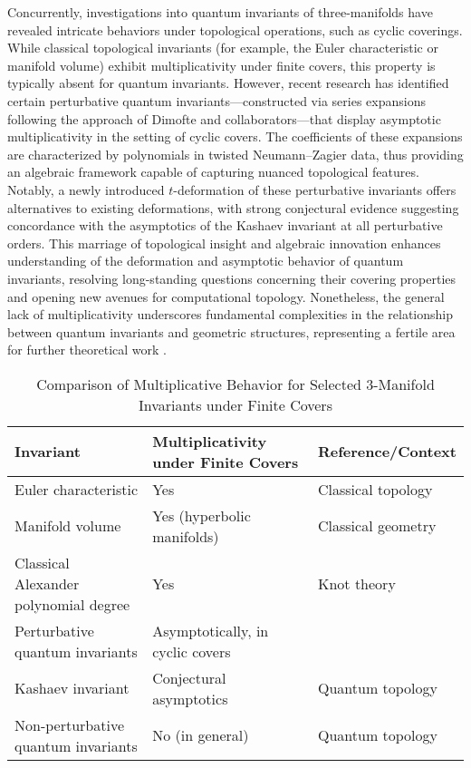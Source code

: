 \documentclass[sigconf]{acmart}
\begin{document}
Concurrently, investigations into quantum invariants of three-manifolds have revealed intricate behaviors under topological operations, such as cyclic coverings. While classical topological invariants (for example, the Euler characteristic or manifold volume) exhibit multiplicativity under finite covers, this property is typically absent for quantum invariants. However, recent research has identified certain perturbative quantum invariants—constructed via series expansions following the approach of Dimofte and collaborators—that display asymptotic multiplicativity in the setting of cyclic covers. The coefficients of these expansions are characterized by polynomials in twisted Neumann–Zagier data, thus providing an algebraic framework capable of capturing nuanced topological features. Notably, a newly introduced $t$-deformation of these perturbative invariants offers alternatives to existing deformations, with strong conjectural evidence suggesting concordance with the asymptotics of the Kashaev invariant at all perturbative orders. This marriage of topological insight and algebraic innovation enhances understanding of the deformation and asymptotic behavior of quantum invariants, resolving long-standing questions concerning their covering properties and opening new avenues for computational topology. Nonetheless, the general lack of multiplicativity underscores fundamental complexities in the relationship between quantum invariants and geometric structures, representing a fertile area for further theoretical work \cite{ref89}.

\begin{table*}[htbp]
\centering
\caption{Comparison of Multiplicative Behavior for Selected 3-Manifold Invariants under Finite Covers}
\label{tab:covering_invariants}
\begin{adjustbox}{max width=\textwidth}
\begin{tabular}{lll}
\toprule
\textbf{Invariant} & \textbf{Multiplicativity under Finite Covers} & \textbf{Reference/Context} \\
\midrule
Euler characteristic & Yes & Classical topology \\
Manifold volume & Yes (hyperbolic manifolds) & Classical geometry \\
Classical Alexander polynomial degree & Yes & Knot theory \\
Perturbative quantum invariants & Asymptotically, in cyclic covers & \cite{ref89} \\
Kashaev invariant & Conjectural asymptotics & Quantum topology \\
Non-perturbative quantum invariants & No (in general) & Quantum topology \\
\bottomrule
\end{tabular}
\end{adjustbox}
\end{table*}
\end{document}
